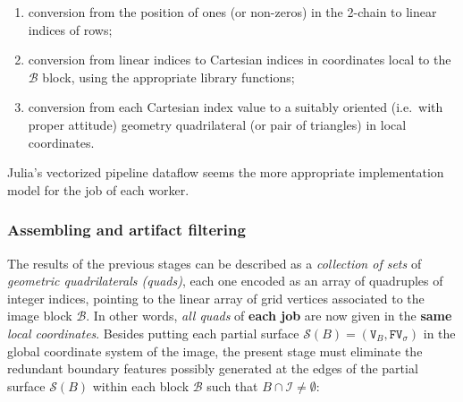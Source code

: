 \begin{enumerate}

\item conversion from the position of ones (or non-zeros) in the 2-chain to linear indices of rows;

\item conversion from linear indices to Cartesian indices in coordinates local to the $\mathcal{B}$ block, using the appropriate library functions;

\item conversion from each Cartesian index value to a suitably oriented (i.e.~with proper attitude) geometry quadrilateral (or pair of triangles) in local coordinates.

\end{enumerate}

Julia's vectorized pipeline dataflow seems the more appropriate implementation model for the job of each worker.

\subsubsection*{Assembling and artifact filtering}\label{sec:artifact-filtering}
The results of the previous stages can be described as a \emph{collection of sets} of \emph{geometric quadrilaterals (quads)}, each one encoded as an array of quadruples of integer indices, pointing to the linear array of grid vertices associated to the image block $\mathcal{B}$.  In other words, \emph{all quads} of \textbf{each job} are now given in the \textbf{same} \emph{local coordinates}.  Besides putting each partial surface $\mathcal{S}(B) = (\texttt{V}_B, \texttt{FV}_\sigma)$ in the global coordinate system of the image, the present stage must eliminate the redundant boundary features possibly generated at the edges of the partial surface $\mathcal{S}(B)$ within each block $\mathcal{B}$ such that $B \cap \mathcal{I} \not= \emptyset$:

